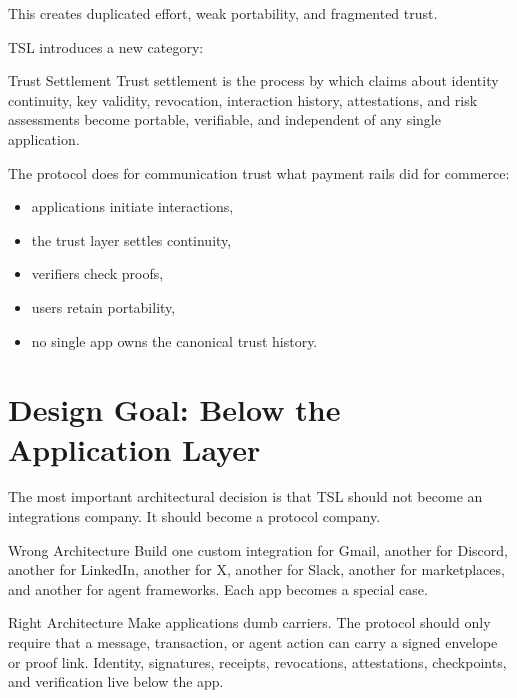\documentclass[11pt]{article}
\newcommand{\TSL}{\textsc{TSL}}
\begin{document}
This creates duplicated effort, weak portability, and fragmented trust.

\TSL{} introduces a new category:

\begin{principlebox}{Trust Settlement}
Trust settlement is the process by which claims about identity continuity, key validity, revocation, interaction history, attestations, and risk assessments become portable, verifiable, and independent of any single application.
\end{principlebox}

The protocol does for communication trust what payment rails did for commerce:

\begin{itemize}
    \item applications initiate interactions,
    \item the trust layer settles continuity,
    \item verifiers check proofs,
    \item users retain portability,
    \item no single app owns the canonical trust history.
\end{itemize}

\section{Design Goal: Below the Application Layer}

The most important architectural decision is that \TSL{} should not become an integrations company. It should become a protocol company.

\begin{warningbox}{Wrong Architecture}
Build one custom integration for Gmail, another for Discord, another for LinkedIn, another for X, another for Slack, another for marketplaces, and another for agent frameworks. Each app becomes a special case.
\end{warningbox}

\begin{principlebox}{Right Architecture}
Make applications dumb carriers. The protocol should only require that a message, transaction, or agent action can carry a signed envelope or proof link. Identity, signatures, receipts, revocations, attestations, checkpoints, and verification live below the app.
\end{principlebox}
\end{document}
